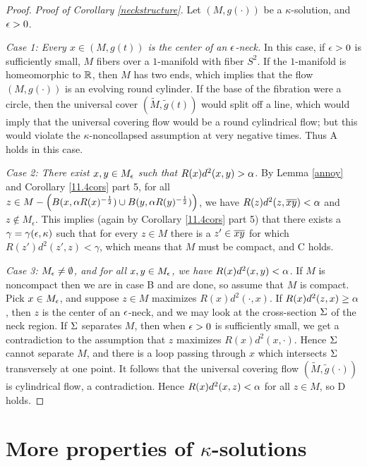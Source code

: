 \begin{proof}
\bigskip
\noindent
{\em Proof of Corollary \ref{neckstructure}.}
Let $(M,g(\cdot))$
be a $\kappa$-solution, and $\epsilon>0$.

\medskip
{\em Case 1: Every $x\in (M,g(t))$
is the center of an $\epsilon$-neck.}  In this case, if $\epsilon>0$ is sufficiently
small, $M$ fibers over a
$1$-manifold with fiber $S^2$.  If the
$1$-manifold is homeomorphic to ${\mathbb R}$, then
$M$ has two ends, which implies that the flow
$(M,g(\cdot))$ is an evolving round cylinder.  If the
base of the fibration were a circle, then the universal
cover $(\tilde M,\tilde g(t))$ would split off
a line, which would imply that the universal covering
flow would be a round cylindrical flow; but this
would violate the $\kappa$-noncollapsed assumption
at very negative times.  Thus A holds in this
case.


{\em Case 2: There exist $x,y\in M_\epsilon$ such that
$R(x)d^2(x,y)>\alpha$.}  By Lemma \ref{annoy} and Corollary \ref{11.4cors}
part 5, for all $z \in M - \left( B(x,\alpha R(x)^{-\frac{1}{2}})\cup
B(y,\alpha R(y)^{-\frac{1}{2}}) \right)
$, we have $R(z)d^2(z,\overline{xy})<\alpha$ and $z \notin M_\epsilon$.
This implies (again by
Corollary \ref{11.4cors} part 5) that there exists a
$\gamma=\gamma(\epsilon,\kappa)$ such that for every $z\in M$
there is a $z'\in\overline{xy}$ for which  $R(z')d^2(z',z)<\gamma$,
which means that $M$ must be compact, and C holds.

{\em Case 3: $M_\epsilon\neq \emptyset$, and for all $x,y\in M_\epsilon$,
we have $R(x)d^2(x,y)<\alpha$.}
If $M$ is noncompact then
we are in case B and are done, so assume that $M$ is compact.
Pick $x\in M_\epsilon$, and suppose  $z\in M$ maximizes
$R(x)d^2(\cdot,x)$.
If $R(x)d^2(z,x)\geq\alpha$,  then $z$ is the center of an $\epsilon$-neck, and we
may look at the cross-section $\Sigma$ of the neck region.
If $\Sigma$ separates $M$, then when $\epsilon>0$ is sufficiently
small, we  get a contradiction to the assumption
that $z$ maximizes $R(x)d^2(x,\cdot)$.  Hence
$\Sigma$ cannot separate $M$, and there is a loop
passing through $x$ which intersects $\Sigma$ transversely
at one point.  It follows that the universal covering flow
$(\tilde M,\tilde g(\cdot))$ is cylindrical flow, a contradiction.
Hence $R(x)d^2(x,z)<\alpha$ for all $z\in M$, so D holds.
\end{proof}



\section{More properties of $\kappa$-solutions}

